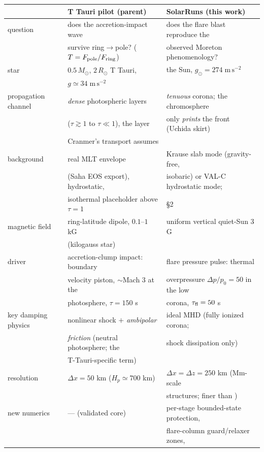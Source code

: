 \documentclass[11pt,a4paper]{article}
\newcommand{\Rsun}{R_\odot}
\begin{document}
\begin{table}[h]\centering\small
\begin{tabular}{lll}
\toprule
 & \textbf{T Tauri pilot (parent)} & \textbf{SolarRuns (this work)}\\
\midrule
question & does the accretion-impact wave & does the flare blast reproduce the\\
 & survive ring$\to$pole? ($T=F_{\rm pole}/F_{\rm ring}$) & observed Moreton phenomenology?\\
star & $0.5\,M_\odot$, $2\,\Rsun$ T Tauri, & the Sun, $g_\odot=274\;\mathrm{m\,s^{-2}}$\\
 & $g\simeq34\;\mathrm{m\,s^{-2}}$ & \\
propagation channel & \emph{dense} photospheric layers & \emph{tenuous} corona; the chromosphere\\
 & ($\tau\gtrsim1$ to $\tau\ll1$), the layer & only \emph{prints} the front (Uchida skirt)\\
 & Cranmer's transport assumes & \\
background & real MLT envelope & Krause slab mode (gravity-free,\\
 & (Saha EOS export), hydrostatic, & isobaric) or VAL-C hydrostatic mode;\\
 & isothermal placeholder above $\tau{=}1$ & \S2\\
magnetic field & ring-latitude dipole, $0.1$--$1$ kG & uniform vertical quiet-Sun $3$ G\\
 & (kilogauss star) & \\
driver & accretion-clump impact: boundary & flare pressure pulse: thermal\\
 & velocity piston, $\sim$Mach 3 at the & overpressure $\Delta p/p_0=50$ in the low\\
 & photosphere, $\tau=150$ s & corona, $\tau_{\rm fl}=50$ s\\
key damping physics & nonlinear shock $+$ \emph{ambipolar} & ideal MHD (fully ionized corona;\\
 & \emph{friction} (neutral photosphere; the & shock dissipation only)\\
 & T-Tauri-specific term) & \\
resolution & $\Delta x=50$ km ($H_p\simeq700$ km) & $\Delta x=\Delta z=250$ km (Mm-scale\\
 & & structures; finer than \cite{Krause2015})\\
new numerics & --- (validated core) & per-stage bounded-state protection,\\
 & & flare-column guard/relaxer zones,\\

\end{tabular}
\end{table}
\end{document}

